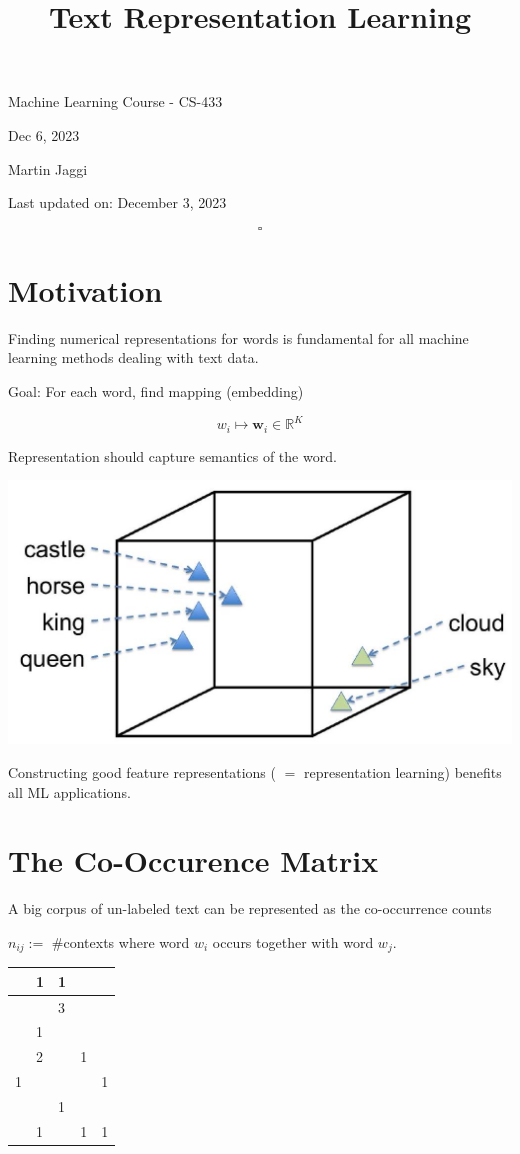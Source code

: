 \documentclass[10pt]{article}
\title{Text Representation Learning }
\author{}
\date{}
\begin{document}
\maketitle
Machine Learning Course - CS-433

Dec 6, 2023

Martin Jaggi

Last updated on: December 3, 2023

$$
\square
$$

\section*{Motivation}
Finding numerical representations for words is fundamental for all machine learning methods dealing with text data.

Goal: For each word, find mapping (embedding)

$$
w_{i} \mapsto \mathbf{w}_{i} \in \mathbb{R}^{K}
$$

Representation should capture semantics of the word.

\begin{center}
\includegraphics[max width=\textwidth]{2023_12_29_a68c38042b8470fb184bg-02}
\end{center}

Constructing good feature representations ( $=$ representation learning) benefits all ML applications.

\section*{The Co-Occurence Matrix}
A big corpus of un-labeled text can be represented as the co-occurrence counts

$n_{i j}:=$ \#contexts where word $w_{i}$ occurs together with word $w_{j}$.

\begin{center}
\begin{tabular}{|l|l|l|l|l|}
\hline
 & 1 & 1 &  &  \\
\hline
 &  & 3 &  &  \\
\hline
 & 1 &  &  &  \\
\hline
 & 2 &  & 1 &  \\
\hline
1 &  &  &  & 1 \\
\hline
 &  & 1 &  &  \\
\hline
 & 1 &  & 1 & 1 \\
\hline
\end{tabular}
\end{center}
\end{document}
